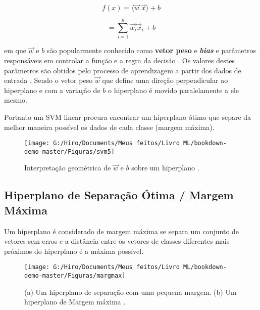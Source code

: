 \documentclass[
]{book}
\begin{document}
\begin{equation}
f(x)= \langle\vec{w}.\vec{x}\rangle+b
\label{eq:classlin}
\end{equation}

\begin{equation}
= \displaystyle \sum^n_{i=1} \vec{w_i} \vec{x}_i+b
\label{eq:classlin2}
\end{equation}

em que \(\vec{w}\) e \(b\) são popularmente conhecido como \textbf{vetor peso} e \textbf{\emph{bias}} e parâmetros responsáveis em controlar a função e a regra da decisão \citep{lima2002maquinas}. Os valores destes parâmetros são obtidos pelo processo de aprendizagem a partir dos dados de entrada \citep{gonccalves2015maquina}. Sendo o vetor peso \(\vec{w}\) que define uma direção perpendicular ao hiperplano e com a variação de \(b\) o hiperplano é movido paralelamente a ele mesmo.

Portanto um SVM linear procura encontrar um hiperplano ótimo que separe da melhor maneira possível os dados de cada classe (margem máxima).

\begin{figure}

{\centering \texttt{[image: G:/Hiro/Documents/Meus feitos/Livro ML/bookdown-demo-master/Figuras/svm5]} 

}

\caption{Interpretação geométrica de \(\vec{w}\) e \(b\) sobre um hiperplano \citep{lima2002maquinas, gonccalves2015maquina}.}\label{fig:svm5}
\end{figure}



\hypertarget{margmax}{%
\subsection{Hiperplano de Separação Ótima / Margem Máxima}\label{margmax}}

Um hiperplano é considerado de margem máxima se separa um conjunto de vetores sem erros e a distância entre os vetores de classes diferentes mais próximos do hiperplano é a máxima possível.

\begin{figure}

{\centering \texttt{[image: G:/Hiro/Documents/Meus feitos/Livro ML/bookdown-demo-master/Figuras/margmax]} 

}

\caption{(a) Um hiperplano de separação com uma pequena margem. (b) Um hiperplano de Margem máxima \citep{da2009classificaccao}.}\label{fig:margmax}
\end{figure}
\end{document}
